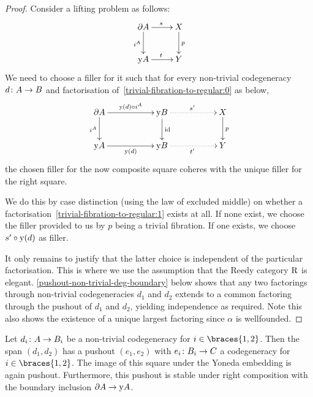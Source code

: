 \documentclass[reqno,10pt,a4paper,oneside,draft]{amsart}
\begin{document}
\begin{proof}
Consider a lifting problem as follows:
\begin{equation} \label{trivial-fibration-to-regular:0}
\xymatrix{
  \partial A
  \ar[d]_{i^A}
  \ar[r]^{s}
&
  X
  \ar[d]^{p}
\\
  \yon A
  \ar[r]^{t}
&
  Y
}
\end{equation}
We need to choose a filler for it such that for every non-trivial codegeneracy $d \colon A \to B$ and factorisation of~\eqref{trivial-fibration-to-regular:0} as below,
\begin{equation} \label{trivial-fibration-to-regular:1}
\xymatrix@C+3em{
  \partial A
  \ar[r]^{\yon(d) \cc i^A}
  \ar[d]_{i^A}
&
  \yon B
  \ar@{.>}[r]^{s'}
  \ar[d]^{\id}
&
  X
  \ar[d]^{p}
\\
  \yon A
  \ar[r]_{\yon(d)}
&
  \yon B
  \ar@{.>}[r]_{t'}
&
  Y
}
\end{equation}
the chosen filler for the now composite square coheres with the unique filler for the right square.

We do this by case distinction (using the law of excluded middle) on whether a factorisation~\eqref{trivial-fibration-to-regular:1} exists at all.
If none exist, we choose the filler provided to us by $p$ being a trivial fibration.
If one exists, we choose $s' \mathbin{\circ} \mathrm{y}(d)$ as filler.

It only remains to justify that the latter choice is independent of the particular factorisation.
This is where we use the assumption that the Reedy category $\mathrm{R}$ is elegant.
\cref{pushout-non-trivial-deg-boundary} below shows that any two factorings through non-trivial codegeneracies $d_1$ and $d_2$ extends to a common factoring through the pushout of $d_1$ and $d_2$, yielding independence as required.
Note this also shows the existence of a unique largest factoring since $\alpha$ is wellfounded.
\end{proof}

\begin{lemma}
\label{pushout-non-trivial-deg-boundary}
Let $d_i \colon A \to B_i$ be a non-trivial codegeneracy for $i \in \braces{1, 2}$.
Then the span $(d_1, d_2)$ has a pushout $(e_1, e_2)$ with $e_i \colon B_i \to C$ a codegeneracy for $i \in \braces{1, 2}$.
The image of this square under the Yoneda embedding is again pushout.
Furthermore, this pushout is stable under right composition with the boundary inclusion $\partial A \to \mathrm{y} A$.
\end{lemma}
\end{document}
